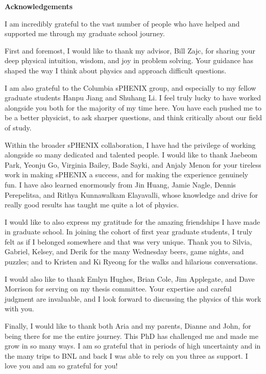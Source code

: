 
\clearpage
\begin{center}

\vspace*{5\baselineskip}
\textbf{\large Acknowledgements}
\end{center}


\begin{flushleft}
\hspace{10mm}
I am incredibly grateful to the vast number of people who have helped and supported me through my graduate school journey.

First and foremost, I would like to thank my advisor, Bill Zajc, for sharing your deep physical intuition, wisdom, and joy in problem solving. Your guidance has shaped the way I think about physics and approach difficult questions.

I am also grateful to the Columbia sPHENIX group, and especially to my fellow graduate students Hanpu Jiang and Shuhang Li. I feel truly lucky to have worked alongside you both for the majority of my time here. You have each pushed me to be a better physicist, to ask sharper questions, and think critically about our field of study.

Within the broader sPHENIX collaboration, I have had the privilege of working alongside so many dedicated and talented people. I would like to thank Jaebeom Park, Yeonju Go, Virginia Bailey, Bade Sayki, and Anjaly Menon for your tireless work in making sPHENIX a success, and for making the experience genuinely fun. I have also learned enormously from Jin Huang, Jamie Nagle, Dennis Perepelitsa, and Rithya Kunnawalkam Elayavalli, whose knowledge and drive for really good results has taught me quite a lot of physics.

I would like to also express my gratitude for the amazing friendships I have made in graduate school. In joining the cohort of first year graduate students, I truly felt as if I belonged somewhere and that was very unique. Thank you to Silvia, Gabriel, Kelsey, and Derik for the many Wednesday beers, game nights, and puzzles; and to Kristen and Ki Ryeong for the walks and hilarious conversations.

I would also like to thank Emlyn Hughes, Brian Cole, Jim Applegate, and Dave Morrison for serving on my thesis committee. Your expertise and careful judgment are invaluable, and I look forward to discussing the physics of this work with you.

Finally, I would like to thank both Aria and my parents, Dianne and John, for being there for me the entire journey. This PhD has challenged me and made me grow in so many ways. I am so grateful that in periods of high uncertainty and in the many trips to BNL and back I was able to rely on you three as support. I love you and am so grateful for you!

\end{flushleft}
\clearpage



